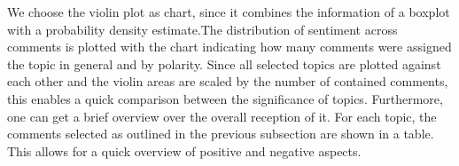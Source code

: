 We choose the violin plot as chart, since it combines the information of a boxplot with a probability density estimate.The distribution of sentiment across comments is plotted with the chart indicating how many comments were assigned the topic in general and by polarity. Since all selected topics are plotted against each other and the violin areas are scaled by the number of contained comments, this enables a quick comparison between the significance of topics. Furthermore, one can get a brief overview over the overall reception of it.
For each topic, the comments selected as outlined in the previous subsection are shown in a table. This allows for a quick overview of positive and negative aspects.
\clearpage